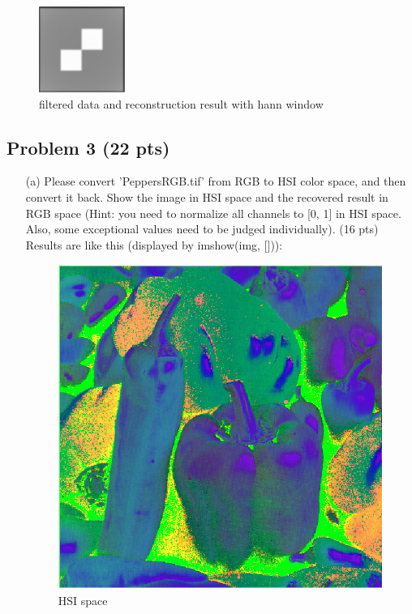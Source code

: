 \documentclass[11pt,letterpaper]{article}
\begin{document}
\begin{figure}
	\includegraphics[width=0.25\textwidth]{images/p2d/han_res.png}
	\caption{filtered data and reconstruction result with hann window}
	\label{fig:p2d}
\end{figure}

\clearpage

\subsection*{Problem 3 (22 pts)}
\begin{itemize}
\item[(a)] Please convert 'PeppersRGB.tif' from RGB to HSI color space, and then convert it back. Show the image in HSI space and the recovered result in RGB space (Hint: you need to normalize all channels to [0, 1] in HSI space. Also, some exceptional values need to be judged individually). (16 pts)\\
Results are like this (displayed by imshow(img, [])):\\
\begin{figure}[htbp]
	\centering
	\begin{minipage}{0.49\linewidth}
		\centering
		\includegraphics[width=0.8\linewidth]{hsi_space.png}
		\caption{HSI space}

\end{minipage}
\end{figure}
\end{itemize}
\end{document}
